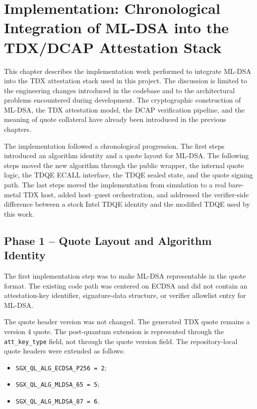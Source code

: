 \chapter{Implementation: Chronological Integration of ML-DSA into the TDX/DCAP Attestation Stack}

This chapter describes the implementation work performed to integrate ML-DSA
into the TDX attestation stack used in this project. The discussion is limited
to the engineering changes introduced in the codebase and to the architectural
problems encountered during development. The cryptographic construction of
ML-DSA, the TDX attestation model, the DCAP verification pipeline, and the
meaning of quote collateral have already been introduced in the previous
chapters.

The implementation followed a chronological progression. The first steps
introduced an algorithm identity and a quote layout for ML-DSA. The following
steps moved the new algorithm through the public wrapper, the internal quote
logic, the TDQE ECALL interface, the TDQE sealed state, and the quote signing
path. The last steps moved the implementation from simulation to a real
bare-metal TDX host, added host--guest orchestration, and addressed the
verifier-side difference between a stock Intel TDQE identity and the modified
TDQE used by this work.

\section{Phase 1 -- Quote Layout and Algorithm Identity}

The first implementation step was to make ML-DSA representable in the quote
format. The existing code path was centered on ECDSA and did not contain an
attestation-key identifier, signature-data structure, or verifier allowlist
entry for ML-DSA.

The quote header version was not changed. The generated TDX quote remains a
version 4 quote. The post-quantum extension is represented through the
\texttt{att\_key\_type} field, not through the quote version field. The
repository-local quote headers were extended as follows:

\begin{itemize}
  \item \texttt{SGX\_QL\_ALG\_ECDSA\_P256 = 2};
  \item \texttt{SGX\_QL\_ALG\_MLDSA\_65 = 5};
  \item \texttt{SGX\_QL\_ALG\_MLDSA\_87 = 6}.
\end{itemize}

